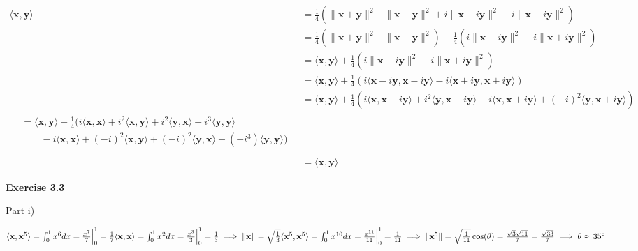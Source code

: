 \documentclass[letterpaper,12pt]{article}
\newcommand{\vect}[1]{\mathbf{#1}}
\begin{document}
\begin{align*}
  \langle \vect{x}, \vect{y} \rangle &= \frac{1}{4}(\|\vect{x} + \vect{y}\|^2 - \|\vect{x} - \vect{y}\|^2 + i\|\vect{x} - i\vect{y}\|^2 - i\|\vect{x} + i\vect{y}\|^2) \\
  &= \frac{1}{4}(\|\vect{x} + \vect{y}\|^2 - \|\vect{x} - \vect{y}\|^2) + \frac{1}{4} (i\|\vect{x} - i\vect{y}\|^2 - i\|\vect{x} + i\vect{y}\|^2) \\
  &= \langle \vect{x}, \vect{y} \rangle + \frac{1}{4} (i\|\vect{x} - i\vect{y}\|^2 - i\|\vect{x} + i\vect{y}\|^2) \\
  &= \langle \vect{x}, \vect{y} \rangle + \frac{1}{4} (i\langle \vect{x} - i\vect{y}, \vect{x} - i\vect{y} \rangle - i\langle \vect{x} + i\vect{y}, \vect{x} + i\vect{y} \rangle) \\
  &= \langle \vect{x}, \vect{y} \rangle + \frac{1}{4}
  (i \langle \vect{x}, \vect{x} - i\vect{y} \rangle +  i^2 \langle \vect{y}, \vect{x} - i\vect{y} \rangle - i \langle \vect{x}, \vect{x} + i\vect{y} \rangle + (-i)^2 \langle \vect{y}, \vect{x} + i\vect{y} \rangle) \\
\begin{split}
    &= \langle \vect{x}, \vect{y} \rangle + \frac{1}{4}
    (i \langle \vect{x}, \vect{x} \rangle + i^2 \langle \vect{x}, \vect{y} \rangle + i^2 \langle \vect{y}, \vect{x} \rangle + i^3 \langle \vect{y}, \vect{y} \rangle \\
    &\qquad - i \langle \vect{x}, \vect{x} \rangle + (-i)^2 \langle \vect{x}, \vect{y} \rangle + (-i)^2 \langle \vect{y}, \vect{x} \rangle + (-i^3) \langle \vect{y}, \vect{y} \rangle)\ \\
\end{split}\\
  &= \langle \vect{x}, \vect{y} \rangle
\end{align*}

\textbf{Exercise 3.3}

\underline{Part i)}

\begin{math}
  \langle \vect{x}, \vect{x}^5 \rangle = \int_0^1 x^6 dx = \frac{x^7}{7} \Big|_0^1 = \frac{1}{7} \\
  \langle \vect{x}, \vect{x} \rangle = \int_0^1 x^2 dx = \frac{x^3}{3} \Big|_0^1 = \frac{1}{3} 
  \implies \|\vect{x}\| = \sqrt{\frac{1}{3}} \\
  \langle \vect{x}^5, \vect{x}^5 \rangle = \int_0^1 x^{10} dx = \frac{x^{11}}{11} \Big|_0^{1} = \frac{1}{11} \implies \|\vect{x}^5\| = \sqrt{\frac{1}{11}} \\
  
  \cos(\theta) = \frac{\sqrt{3} \sqrt{11}}{7} = \frac{\sqrt{33}}{7}
  \implies \theta \approx 35 \degree
  
\end{math}
  
\end{document}
